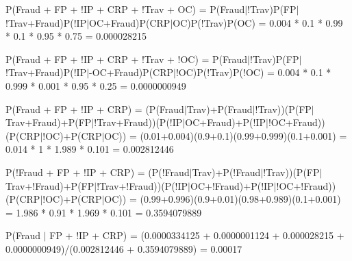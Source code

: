 \documentclass{article}
\begin{document}
	P(Fraud + FP + !IP + CRP + !Trav + OC) = P(Fraud$|$!Trav)P(FP$|$!Trav+Fraud)P(!IP$|$OC+Fraud)P(CRP$|$OC)P(!Trav)P(OC) = 0.004 * 0.1 * 0.99 * 0.1 * 0.95 * 0.75 = 0.000028215
	
	P(Fraud + FP + !IP + CRP + !Trav + !OC) = P(Fraud$|$!Trav)P(FP$|$!Trav+Fraud)P(!IP$|$-OC+Fraud)P(CRP$|$!OC)P(!Trav)P(!OC) = 0.004 * 0.1 * 0.999 * 0.001 * 0.95 * 0.25 = 0.0000000949
	
	P(Fraud + FP + !IP + CRP) = (P(Fraud$|$Trav)+P(Fraud$|$!Trav))(P(FP$|$Trav+Fraud)+P(FP$|$!Trav+Fraud))(P(!IP$|$OC+Fraud)+P(!IP$|$!OC+Fraud))(P(CRP$|$!OC)+P(CRP$|$OC)) = (0.01+0.004)(0.9+0.1)(0.99+0.999)(0.1+0.001) = 0.014 * 1 * 1.989 * 0.101 = 0.002812446
	
	P(!Fraud + FP + !IP + CRP) = (P(!Fraud$|$Trav)+P(!Fraud$|$!Trav))(P(FP$|$Trav+!Fraud)+P(FP$|$!Trav+!Fraud))(P(!IP$|$OC+!Fraud)+P(!IP$|$!OC+!Fraud))(P(CRP$|$!OC)+P(CRP$|$OC)) = (0.99+0.996)(0.9+0.01)(0.98+0.989)(0.1+0.001) = 1.986 * 0.91 * 1.969 * 0.101 = 0.3594079889
	
	P(Fraud $|$ FP + !IP + CRP) = (0.0000334125 + 0.0000001124 + 0.000028215 + 0.0000000949)/(0.002812446 + 0.3594079889) = 0.00017
\end{document}

